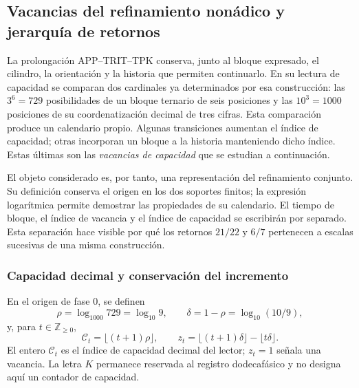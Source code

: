 \subsection{Vacancias del refinamiento nonádico y jerarquía de retornos}
\label{vac-add-seccion}

La prolongación APP--TRIT--TPK conserva, junto al bloque expresado, el
cilindro, la orientación y la historia que permiten continuarlo. En su
lectura de capacidad se comparan dos cardinales ya determinados por esa
construcción: las \(3^6=729\) posibilidades de un bloque ternario de seis
posiciones y las \(10^3=1000\) posiciones de su coordenatización decimal de tres
cifras. Esta comparación produce un calendario propio. Algunas
transiciones aumentan el índice de capacidad; otras incorporan un bloque
a la historia manteniendo dicho índice. Estas últimas son las
\emph{vacancias de capacidad} que se estudian a continuación.

El objeto considerado es, por tanto, una representación del refinamiento
conjunto. Su definición conserva el origen en los dos soportes finitos;
la expresión logarítmica permite demostrar las propiedades de su
calendario. El tiempo de bloque, el índice de vacancia y el índice de
capacidad se escribirán por separado. Esta separación hace visible por
qué los retornos \(21/22\) y \(6/7\) pertenecen a escalas sucesivas de
una misma construcción.

\subsubsection{Capacidad decimal y conservación del incremento}
\label{vac-add-capacidad}

\begin{definition}
\label{vac-add-definicion}
En el origen de fase \(0\), se definen
\begin{equation}
 \rho=\log_{1000}729=\log_{10}9,
 \qquad \delta=1-\rho=\log_{10}(10/9),
 \label{vac-add-densidad}
\end{equation}
y, para \(t\in\mathbb Z_{\geq0}\),
\begin{equation}
 \mathcal C_t=\lfloor(t+1)\rho\rfloor,
 \qquad
 z_t=\lfloor(t+1)\delta\rfloor-\lfloor t\delta\rfloor.
 \label{vac-add-indices}
\end{equation}
El entero \(\mathcal C_t\) es el índice de capacidad decimal del lector;
\(z_t=1\) señala una vacancia. La letra \(K\) permanece reservada al
registro dodecafásico y no designa aquí un contador de capacidad.
\end{definition}

